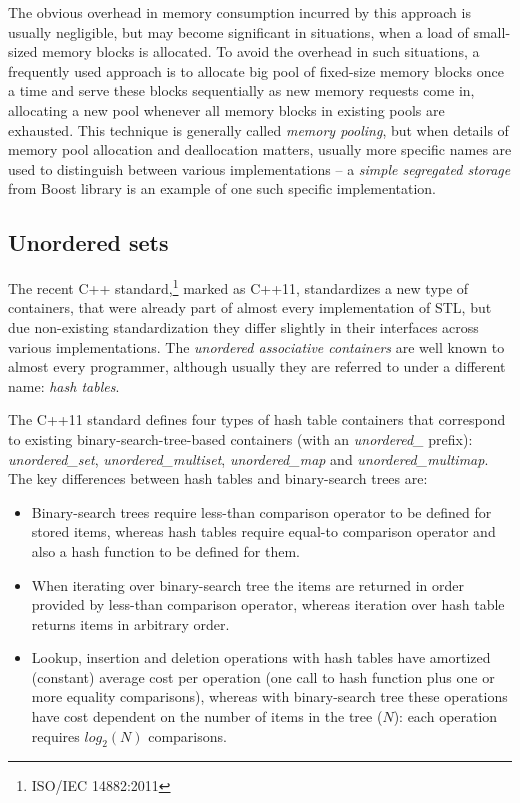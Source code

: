 The obvious overhead in memory consumption incurred by this approach is usually negligible,
but may become significant in situations, when a load of small-sized memory blocks is allocated.
To avoid the overhead in such situations, a frequently used approach is to allocate big pool of
fixed-size memory blocks once a time and serve these blocks sequentially as new memory requests
come in, allocating a new pool whenever all memory blocks in existing pools are exhausted.
This technique is generally called \emph{memory pooling}, but when details of
memory pool allocation and deallocation matters, usually more specific names are used to
distinguish between various implementations --  a \emph{simple segregated storage} from Boost
library is an example of one such specific
implementation.


\subsection{Unordered sets}

The recent C++ standard,\footnote{ISO/IEC 14882:2011} marked as C++11, standardizes
a new type of containers, that were already part of almost every implementation of STL,
but due non-existing standardization they differ slightly in their interfaces across
various implementations.
The \emph{unordered associative containers} are well known to almost every programmer,
although usually they are referred to under a different name: \emph{hash tables}.

The C++11 standard defines four types of hash table containers that correspond to existing
binary-search-tree-based containers (with an \emph{unordered_} prefix):
\emph{unordered_set}, \emph{unordered_multiset}, \emph{unordered_map} and \emph{unordered_multimap}.
The key differences between hash tables and binary-search trees are:
\begin{itemize}
  \item Binary-search trees require less-than comparison operator to be defined for stored items,
  whereas hash tables require equal-to comparison operator and also a hash function to be
  defined for them.
  \item When iterating over binary-search tree the items are returned in order provided by
  less-than comparison operator, whereas iteration over hash table returns items in arbitrary
  order.
  \item Lookup, insertion and deletion operations with hash tables have amortized (constant)
  average cost per operation (one call to hash function plus one or more equality comparisons),
  whereas with binary-search tree these operations have cost dependent on the number of items
  in the tree ($N$): each operation requires $log_2(N)$ comparisons.
\end{itemize}

